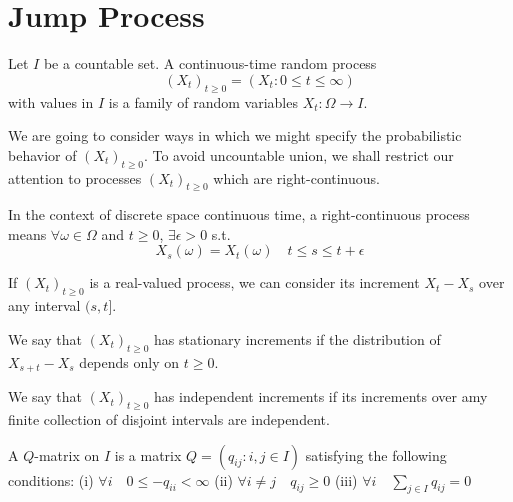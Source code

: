 \chapter{Jump Process}

\begin{definition}
    Let $I$ be a countable set. A continuous-time random process \[(X_t)_{t\geq 0}=(X_t:0\leq t\leq\infty)\] 
    with values in $I$ is a family of random variables $X_t:\Omega\to I$.
\end{definition}
We are going to consider ways in which we might specify the probabilistic behavior of $(X_t)_{t\geq 0}$.
To avoid uncountable union, we shall restrict our attention to processes $(X_t)_{t\geq 0}$ which are right-continuous.
\begin{definition}
    In the context of discrete space continuous time, a right-continuous process means $\forall \omega\in\Omega$
    and $t\geq 0$, $\exists \epsilon>0$ s.t. \[X_s(\omega)=X_t(\omega)\quad t\leq s\leq t+\epsilon\]
\end{definition}
\begin{definition}[increment]
    If $(X_t)_{t\geq 0}$ is a real-valued process, we can consider its increment $X_t-X_s$ over any interval $(s,t]$.
\end{definition}
\begin{definition}[stationary]
    We say that $(X_t)_{t\geq 0}$ has stationary increments if the distribution of $X_{s+t}-X_s$ depends only on $t\geq 0$.
\end{definition}
\begin{definition}[independent]
    We say that $(X_t)_{t\geq 0}$ has independent increments if its increments over amy finite collection of disjoint intervals are independent.
\end{definition}
\begin{definition}[$Q$-matrix]
    A $Q$-matrix on $I$ is a matrix $Q=(q_{ij}:i,j\in I)$ satisfying the following conditions:\newline
(i) $\forall i\quad 0\leq -q_{ii}<\infty$ \newline 
(ii) $\forall i\ne j\quad q_{ij}\geq 0$\newline 
(iii) $\forall i\quad \sum_{j\in I}q_{ij}=0$
\end{definition}


